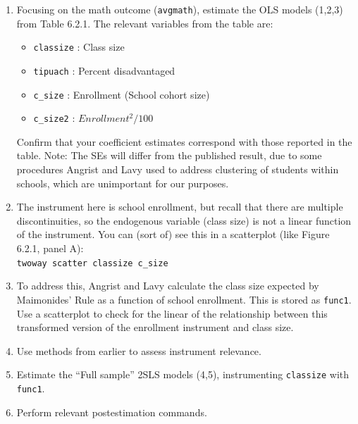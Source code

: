 \documentclass[a4paper,12pt]{article}
\begin{document}
\begin{enumerate}
\item Focusing on the math outcome (\texttt{avgmath}), estimate the OLS models (1,2,3) from Table 6.2.1. The relevant variables from the table are:
\begin{itemize}
\item \texttt{classize} : Class size
\item \texttt{tipuach} : Percent disadvantaged
\item \texttt{c\_size} : Enrollment (School cohort size)
\item \texttt{c\_size2} : $Enrollment^2/100$
\end{itemize}

Confirm that your coefficient estimates correspond with those reported in the table. Note: The SEs will differ from the published result, due to some procedures Angrist and Lavy used to address clustering of students within schools, which are unimportant for our purposes.

\item The instrument here is school enrollment, but recall that there are multiple discontinuities, so the endogenous variable (class size) is not a linear function of the instrument. You can (sort of) see this in a scatterplot (like Figure 6.2.1, panel A):\\
\texttt{twoway scatter classize c\_size}

\item To address this, Angrist and Lavy calculate the class size expected by Maimonides' Rule as a function of school enrollment. This is stored as \texttt{func1}. Use a scatterplot to check for the linear of the relationship between this transformed version of the enrollment instrument and class size.

\item Use methods from earlier to assess instrument relevance.
\item Estimate the ``Full sample'' 2SLS models (4,5), instrumenting \texttt{classize} with \texttt{func1}.
\item Perform relevant postestimation commands.


\end{enumerate}
\end{document}
